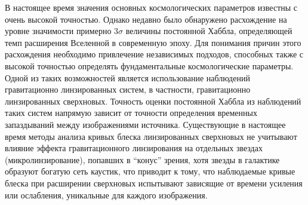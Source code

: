 В настоящее время значения основных космологических параметров известны с очень высокой точностью. Однако недавно было обнаружено расхождение на уровне значимости примерно 3$\sigma$ величины постоянной Хаббла, определяющей темп расширения Вселенной в современную эпоху. Для понимания причин этого расхождения необходимо привлечение независимых подходов, способных также с высокой точностью определять фундаментальные космологические параметры. Одной из таких возможностей является использование наблюдений гравитационно линзированных систем, в частности, гравитационно линзированных сверхновых. Точность оценки постоянной Хаббла из наблюдений таких систем напрямую зависит от точности определения временных запаздываний между изображениями источника. Существующие в настоящее время методы анализа кривых блеска линзированных сверхновых не учитывают влияние эффекта гравитационного линзирования на отдельных звездах (микролинзирование), попавших в “конус” зрения, хотя звезды в галактике образуют богатую сеть каустик, что приводит к тому, что наблюдаемые кривые блеска при расширении сверхновых испытывают зависящие от времени усиления или ослабления, уникальные для каждого изображения.
